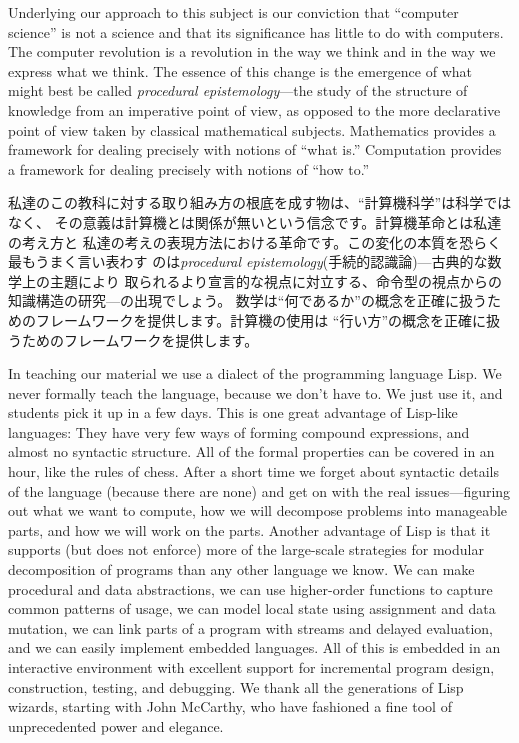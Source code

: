 \documentclass[oneside]{book}
\newcommand{\newterm}[1]{\index{#1}\emph{#1}}
\begin{document}
Underlying our approach to this subject is our conviction that ``computer
science'' is not a science and that its significance has little to do with
computers.  The computer revolution is a revolution in the way we think and in
the way we express what we think.  The essence of this change is the emergence
of what might best be called \newterm{procedural epistemology}---the study of
the structure of knowledge from an imperative point of view, as opposed to the
more declarative point of view taken by classical mathematical subjects.
Mathematics provides a framework for dealing precisely with notions of ``what
is.''  Computation provides a framework for dealing precisely with notions of
``how to.''

私達のこの教科に対する取り組み方の根底を成す物は、``計算機科学''は科学ではなく、
その意義は計算機とは関係が無いという信念です。計算機革命とは私達の考え方と
私達の考えの表現方法における革命です。この変化の本質を恐らく最もうまく言い表わす
のは\newterm{procedural epistemology}(手続的認識論)---古典的な数学上の主題により
取られるより宣言的な視点に対立する、命令型の視点からの知識構造の研究---の出現でしょう。
数学は``何であるか''の概念を正確に扱うためのフレームワークを提供します。計算機の使用は
``行い方''の概念を正確に扱うためのフレームワークを提供します。

In teaching our material we use a dialect of the programming language Lisp.  We
never formally teach the language, because we don't have to.  We just use it,
and students pick it up in a few days.  This is one great advantage of
Lisp-like languages: They have very few ways of forming compound expressions,
and almost no syntactic structure.  All of the formal properties can be covered
in an hour, like the rules of chess.  After a short time we forget about
syntactic details of the language (because there are none) and get on with the
real issues---figuring out what we want to compute, how we will decompose
problems into manageable parts, and how we will work on the parts.  Another
advantage of Lisp is that it supports (but does not enforce) more of the
large-scale strategies for modular decomposition of programs than any other
language we know.  We can make procedural and data abstractions, we can use
higher-order functions to capture common patterns of usage, we can model local
state using assignment and data mutation, we can link parts of a program with
streams and delayed evaluation, and we can easily implement embedded languages.
All of this is embedded in an interactive environment with excellent support
for incremental program design, construction, testing, and debugging.  We thank
all the generations of Lisp wizards, starting with John McCarthy, who have
fashioned a fine tool of unprecedented power and elegance.
\end{document}
